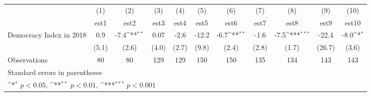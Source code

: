 {
\def\sym#1{\ifmmode^{#1}\else\(^{#1}\)\fi}
\begin{tabular}{l*{10}{c}}
\hline\hline
                    &\multicolumn{1}{c}{(1)}         &\multicolumn{1}{c}{(2)}         &\multicolumn{1}{c}{(3)}         &\multicolumn{1}{c}{(4)}         &\multicolumn{1}{c}{(5)}         &\multicolumn{1}{c}{(6)}         &\multicolumn{1}{c}{(7)}         &\multicolumn{1}{c}{(8)}         &\multicolumn{1}{c}{(9)}         &\multicolumn{1}{c}{(10)}         \\
                    &        est1         &        est2         &        est3         &        est4         &        est5         &        est6         &        est7         &        est8         &        est9         &       est10         \\
\hline
Democracy Index in 2018&         0.9         &        -7.4\sym{**} &        0.07         &        -2.6         &       -12.2         &        -6.7\sym{**} &        -1.6         &        -7.5\sym{***}&       -22.4         &        -8.0\sym{*}  \\
                    &       (5.1)         &       (2.6)         &       (4.0)         &       (2.7)         &       (9.8)         &       (2.4)         &       (2.8)         &       (1.7)         &      (26.7)         &       (3.6)         \\
\hline
Observations        &          80         &          80         &         129         &         129         &         150         &         150         &         135         &         134         &         143         &         143         \\
\hline\hline
\multicolumn{11}{l}{\footnotesize Standard errors in parentheses}\\
\multicolumn{11}{l}{\footnotesize \sym{*} \(p<0.05\), \sym{**} \(p<0.01\), \sym{***} \(p<0.001\)}\\
\end{tabular}
}
